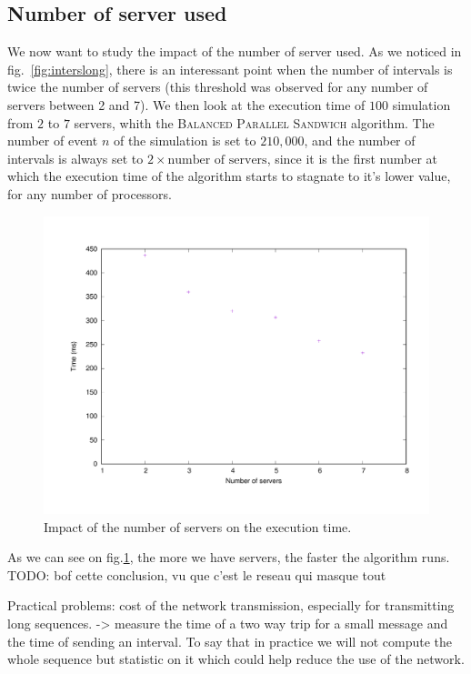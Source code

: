 \documentclass[a4paper,10pt]{article}
\newcommand{\todo}[1]{{\color{red} TODO: {#1}}}
\begin{document}
\subsection{Number of server used}
We now want to study the impact of the number of server used. As we noticed in fig.~\ref{fig:interslong}, there is an interessant point when the number of intervals is twice the number of servers (this threshold was observed for any number of servers between 2 and 7). We then look at the execution time of $100$ simulation from $2$ to $7$ servers, whith the \textsc{Balanced Parallel Sandwich} algorithm. The number of event $n$ of the simulation is set to $210,000$, and the number of intervals is always set to $2 \times \textrm{number of servers}$, since it is the first number at which the execution time of the algorithm starts to stagnate to it's lower value, for any number of processors.

\begin{figure}[H]
\centering
\label{fig:nbservs}
 \includegraphics[scale=0.45]{numberofservers.pdf}
 \caption{Impact of the number of servers on the execution time.}
\end{figure}

As we can see on fig.\ref{fig:nbservs}, the more we have servers, the faster the algorithm runs.
\todo{bof cette conclusion, vu que c'est le reseau qui masque tout}

Practical problems: cost of the network transmission, especially for transmitting long sequences.
-> measure the time of a two way trip for a small message and the time of sending an interval.
To say that in practice we will not compute the whole sequence but statistic on it which could help
reduce the use of the network.
\end{document}
